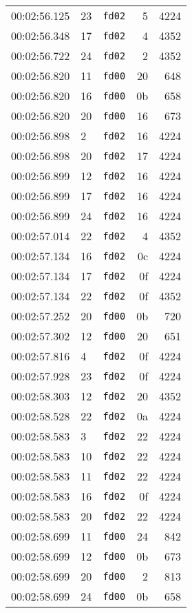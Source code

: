 \documentclass{article}
\begin{document}
\begin{longtable}{lllrr}
00:02:56.125 & 23 & \texttt{fd02} & 5 & 4224 \\
00:02:56.348 & 17 & \texttt{fd02} & 4 & 4352 \\
00:02:56.722 & 24 & \texttt{fd02} & 2 & 4352 \\
00:02:56.820 & 11 & \texttt{fd00} & 20 & 648 \\
00:02:56.820 & 16 & \texttt{fd00} & 0b & 658 \\
00:02:56.820 & 20 & \texttt{fd00} & 16 & 673 \\
00:02:56.898 & 2 & \texttt{fd02} & 16 & 4224 \\
00:02:56.898 & 20 & \texttt{fd02} & 17 & 4224 \\
00:02:56.899 & 12 & \texttt{fd02} & 16 & 4224 \\
00:02:56.899 & 17 & \texttt{fd02} & 16 & 4224 \\
00:02:56.899 & 24 & \texttt{fd02} & 16 & 4224 \\
00:02:57.014 & 22 & \texttt{fd02} & 4 & 4352 \\
00:02:57.134 & 16 & \texttt{fd02} & 0c & 4224 \\
00:02:57.134 & 17 & \texttt{fd02} & 0f & 4224 \\
00:02:57.134 & 22 & \texttt{fd02} & 0f & 4352 \\
00:02:57.252 & 20 & \texttt{fd00} & 0b & 720 \\
00:02:57.302 & 12 & \texttt{fd00} & 20 & 651 \\
00:02:57.816 & 4 & \texttt{fd02} & 0f & 4224 \\
00:02:57.928 & 23 & \texttt{fd02} & 0f & 4224 \\
00:02:58.303 & 12 & \texttt{fd02} & 20 & 4352 \\
00:02:58.528 & 22 & \texttt{fd02} & 0a & 4224 \\
00:02:58.583 & 3 & \texttt{fd02} & 22 & 4224 \\
00:02:58.583 & 10 & \texttt{fd02} & 22 & 4224 \\
00:02:58.583 & 11 & \texttt{fd02} & 22 & 4224 \\
00:02:58.583 & 16 & \texttt{fd02} & 0f & 4224 \\
00:02:58.583 & 20 & \texttt{fd02} & 22 & 4224 \\
00:02:58.699 & 11 & \texttt{fd00} & 24 & 842 \\
00:02:58.699 & 12 & \texttt{fd00} & 0b & 673 \\
00:02:58.699 & 20 & \texttt{fd00} & 2 & 813 \\
00:02:58.699 & 24 & \texttt{fd00} & 0b & 658 \\

\end{longtable}
\end{document}
